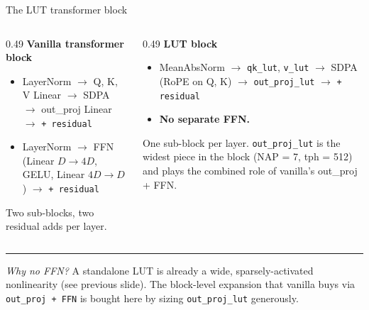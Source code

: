 \documentclass[aspectratio=169]{beamer}
\begin{document}
\begin{frame}{The LUT transformer block}

\begin{columns}[T,onlytextwidth]
\begin{column}{0.49\textwidth}
\textbf{Vanilla transformer block}
\begin{itemize}
\item LayerNorm \(\to\) Q, K, V Linear \(\to\) SDPA \(\to\) out\_proj Linear \(\to\) \texttt{+ residual}
\item LayerNorm \(\to\) FFN (Linear \(D{\to}4D\), GELU, Linear \(4D{\to}D\)) \(\to\) \texttt{+ residual}
\end{itemize}

\medskip
Two sub-blocks, two residual adds per layer.
\end{column}
\begin{column}{0.49\textwidth}
\textbf{LUT block}
\begin{itemize}
\item MeanAbsNorm \(\to\) \texttt{qk\_lut}, \texttt{v\_lut} \(\to\) SDPA (RoPE on Q, K) \(\to\) \texttt{out\_proj\_lut} \(\to\) \texttt{+ residual}
\item \textbf{No separate FFN.}
\end{itemize}

\medskip
One sub-block per layer. \texttt{out\_proj\_lut} is the widest piece in the block (NAP = 7, tph = 512) and plays the combined role of vanilla's out\_proj + FFN.
\end{column}
\end{columns}

\vspace{0.8em}
\hrule
\vspace{0.4em}
\small\emph{Why no FFN?} A standalone LUT is already a wide, sparsely-activated nonlinearity (see previous slide). The block-level expansion that vanilla buys via \texttt{out\_proj + FFN} is bought here by sizing \texttt{out\_proj\_lut} generously.
\end{frame}
\end{document}
